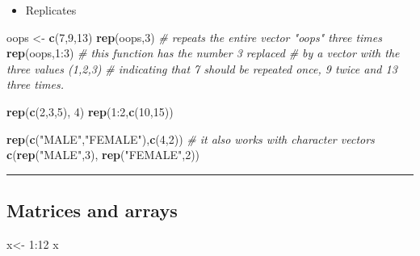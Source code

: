 \documentclass[]{article}
\def\tightlist{}
\newenvironment{Shaded}{\begin{snugshade}}{\end{snugshade}}
\newcommand{\KeywordTok}[1]{\textcolor[rgb]{0.13,0.29,0.53}{\textbf{{#1}}}}
\newcommand{\DecValTok}[1]{\textcolor[rgb]{0.00,0.00,0.81}{{#1}}}
\newcommand{\StringTok}[1]{\textcolor[rgb]{0.31,0.60,0.02}{{#1}}}
\newcommand{\CommentTok}[1]{\textcolor[rgb]{0.56,0.35,0.01}{\textit{{#1}}}}
\newcommand{\NormalTok}[1]{{#1}}
\numberwithin{equation}{section}
\begin{document}
\begin{itemize}
\tightlist
\item
  Replicates
\end{itemize}

\begin{Shaded}
\begin{Highlighting}[]
\NormalTok{oops <-}\StringTok{ }\KeywordTok{c}\NormalTok{(}\DecValTok{7}\NormalTok{,}\DecValTok{9}\NormalTok{,}\DecValTok{13}\NormalTok{)}
\KeywordTok{rep}\NormalTok{(oops,}\DecValTok{3}\NormalTok{) }\CommentTok{# repeats the entire vector "oops" three times}
\KeywordTok{rep}\NormalTok{(oops,}\DecValTok{1}\NormalTok{:}\DecValTok{3}\NormalTok{) }\CommentTok{# this function has the number 3 replaced }
              \CommentTok{#  by a vector with the three values (1,2,3) }
              \CommentTok{#  indicating that 7 should be repeated once, 9 twice and 13 three times.}

\KeywordTok{rep}\NormalTok{(}\KeywordTok{c}\NormalTok{(}\DecValTok{2}\NormalTok{,}\DecValTok{3}\NormalTok{,}\DecValTok{5}\NormalTok{), }\DecValTok{4}\NormalTok{)}
\KeywordTok{rep}\NormalTok{(}\DecValTok{1}\NormalTok{:}\DecValTok{2}\NormalTok{,}\KeywordTok{c}\NormalTok{(}\DecValTok{10}\NormalTok{,}\DecValTok{15}\NormalTok{))}

\KeywordTok{rep}\NormalTok{(}\KeywordTok{c}\NormalTok{(}\StringTok{"MALE"}\NormalTok{,}\StringTok{"FEMALE"}\NormalTok{),}\KeywordTok{c}\NormalTok{(}\DecValTok{4}\NormalTok{,}\DecValTok{2}\NormalTok{)) }\CommentTok{# it also works with character vectors }
\KeywordTok{c}\NormalTok{(}\KeywordTok{rep}\NormalTok{(}\StringTok{"MALE"}\NormalTok{,}\DecValTok{3}\NormalTok{), }\KeywordTok{rep}\NormalTok{(}\StringTok{"FEMALE"}\NormalTok{,}\DecValTok{2}\NormalTok{))}
\end{Highlighting}
\end{Shaded}

\begin{center}\rule{0.5\linewidth}{\linethickness}\end{center}

\subsection{Matrices and arrays}\label{matrices-and-arrays}

\begin{Shaded}
\begin{Highlighting}[]
\NormalTok{x<-}\StringTok{ }\DecValTok{1}\NormalTok{:}\DecValTok{12}
\NormalTok{x}
\end{Highlighting}
\end{Shaded}
\end{document}
